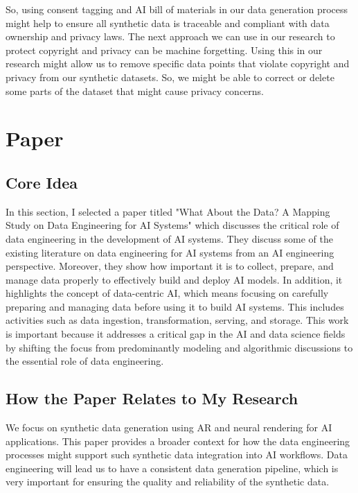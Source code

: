 \documentclass[11pt]{article}
\begin{document}
So, using consent tagging and AI bill of materials in our data generation process might help to ensure all synthetic data is traceable and compliant with data ownership and privacy laws. The next approach we can use in our research to protect copyright and privacy can be machine forgetting. Using this in our research might allow us to remove specific data points that violate copyright and privacy from our synthetic datasets. So, we might be able to correct or delete some parts of the dataset that might cause privacy concerns. 


 

\section{Paper \cite{heck2024data}}

\subsection{Core Idea} 

In this section, I selected a paper titled "What About the Data? A Mapping Study on Data Engineering for AI Systems" \cite{heck2024data} which discusses the critical role of data engineering in the development of AI systems. They discuss some of the existing literature on data engineering for AI systems from an AI engineering perspective. Moreover, they show how important it is to collect, prepare, and manage data properly to effectively build and deploy AI models. In addition, it highlights the concept of data-centric AI, which means focusing on carefully preparing and managing data before using it to build AI systems. This includes activities such as data ingestion, transformation, serving, and storage. This work is important because it addresses a critical gap in the AI and data science fields by shifting the focus from predominantly modeling and algorithmic discussions to the essential role of data engineering.


\subsection{How the Paper Relates to My Research} 

We focus on synthetic data generation using AR and neural rendering for AI applications. This paper provides a broader context for how the data engineering processes might support such synthetic data integration into AI workflows. Data engineering will lead us to have a consistent data generation pipeline, which is very important for ensuring the quality and reliability of the synthetic data. 
\end{document}
